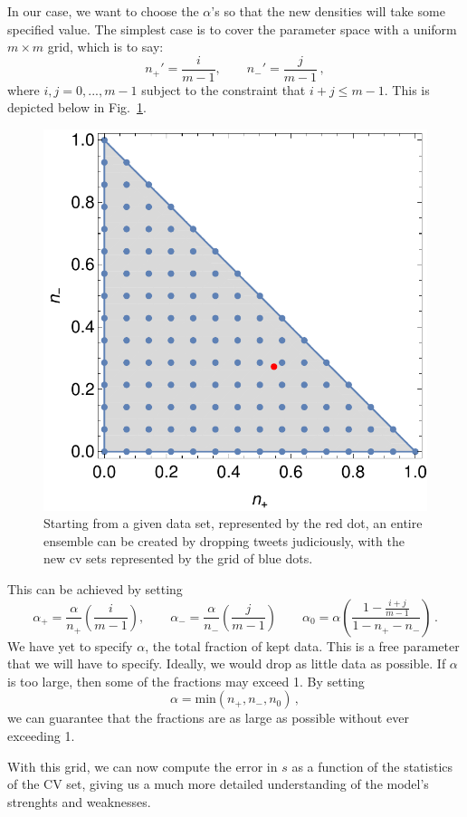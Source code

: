 \documentclass[a4paper,12pt]{article}
\begin{document}
In our case, we want to choose the $\alpha$'s so that the new densities will take some specified value. The simplest case is to cover the parameter space with a uniform $m \times m$ grid, which is to say:
\begin{equation}
n_+' = \frac{i}{m-1}, \qquad n_-' = \frac{j}{m-1} \, ,
\end{equation}
where $i,j = 0, ..., m-1$ subject to the constraint that $i+j \le m-1$. This is depicted below in Fig.~\ref{fig:paramspacegrid}.

\begin{figure}[ht]
\begin{center}
\includegraphics[width=.5\textwidth]{Figures/paramspacegrid.pdf}
\captionsetup{width=0.8\textwidth}
\caption{Starting from a given data set, represented by the red dot, an entire ensemble can be created by dropping tweets judiciously, with the new cv sets represented by the grid of blue dots.}
\label{fig:paramspacegrid}
\end{center}
\end{figure}  

This can be achieved by setting
\begin{equation}
\alpha_+ = \frac{\alpha}{n_+} \left(\frac{i}{m-1}\right), \qquad \alpha_- = \frac{\alpha}{n_-} \left(\frac{j}{m-1}\right) \qquad \alpha_0 = \alpha \left(\frac{1 - \frac{i+j}{m-1}}{1-n_+ - n_-} \right) \, .
\end{equation}
We have yet to specify $\alpha$, the total fraction of kept data. This is a free parameter that we will have to specify. Ideally, we would drop as little data as possible. If $\alpha$ is too large, then some of the fractions may exceed 1. By setting 
\begin{equation}
\alpha = \text{min} \left( n_+, n_-, n_0 \right)\, , 
\end{equation}
we can guarantee that the fractions are as large as possible without ever exceeding 1. 

With this grid, we can now compute the error in $s$ as a function of the statistics of the CV set, giving us a much more detailed understanding of the model's strenghts and weaknesses.



{}

\end{document}
